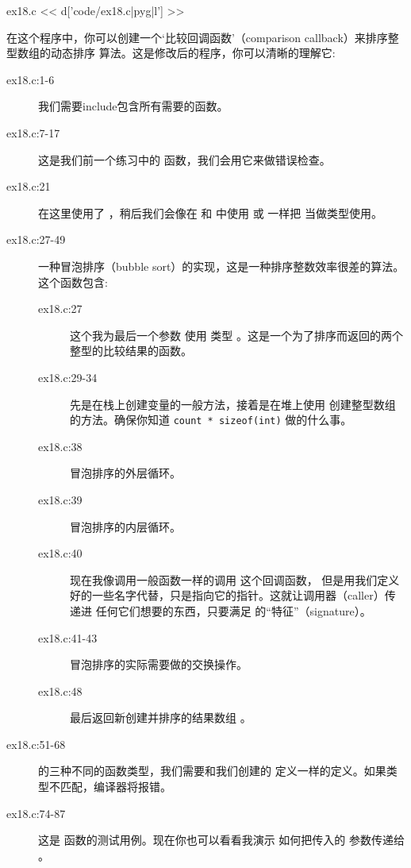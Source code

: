 \begin{code}{ex18.c}
<< d['code/ex18.c|pyg|l'] >>
\end{code}

在这个程序中，你可以创建一个‘比较回调函数’（comparison callback）来排序整型数组的动态排序
算法。这是修改后的程序，你可以清晰的理解它:

\begin{description}
\item[ex18.c:1-6] 我们需要include包含所有需要的函数。
\item[ex18.c:7-17] 这是我们前一个练习中的  函数，我们会用它来做错误检查。
\item[ex18.c:21] 在这里使用了 ，稍后我们会像在  和 
     中使用  或  一样把 
     当做类型使用。
\item[ex18.c:27-49] 一种冒泡排序（bubble sort）的实现，这是一种排序整数效率很差的算法。
    这个函数包含:
    \begin{description}
    \item[ex18.c:27] 这个我为最后一个参数  使用  类型 
        。这是一个为了排序而返回的两个整型的比较结果的函数。
    \item[ex18.c:29-34] 先是在栈上创建变量的一般方法，接着是在堆上使用  
        创建整型数组的方法。确保你知道 \verb|count * sizeof(int)| 做的什么事。
    \item[ex18.c:38] 冒泡排序的外层循环。
    \item[ex18.c:39] 冒泡排序的内层循环。
    \item[ex18.c:40] 现在我像调用一般函数一样的调用  这个回调函数，
        但是用我们定义好的一些名字代替，只是指向它的指针。这就让调用器（caller）传递进
        任何它们想要的东西，只要满足 的“特征”（signature）。
    \item[ex18.c:41-43] 冒泡排序的实际需要做的交换操作。
    \item[ex18.c:48] 最后返回新创建并排序的结果数组 。
    \end{description}
\item[ex18.c:51-68]  的三种不同的函数类型，我们需要和我们创建的 
     定义一样的定义。如果类型不匹配，编译器将报错。
\item[ex18.c:74-87] 这是  函数的测试用例。现在你也可以看看我演示
    如何把传入的  参数传递给 。

\end{description}
